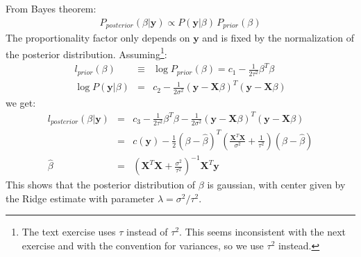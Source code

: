 

From Bayes theorem:
\begin{eqnarray*}
    P_{posterior}(\beta | \mathbf{y}) \propto P(\mathbf{y} | \beta) \, P_{prior}(\beta)
\end{eqnarray*}
The proportionality factor only depends on $\mathbf{y}$ and is fixed by the normalization of
the posterior distribution. Assuming\footnote{The text exercise uses $\tau$ instead of $\tau^2$. This 
    seems inconsistent with the next exercise and with the convention for variances, so we use $\tau^2$ instead.}:
\begin{eqnarray*}
    l_{prior}(\beta) & \equiv & \log{P_{prior}(\beta)} = c_1 - \frac{1}{2 \tau ^2} \beta^T \beta\\
    \log{P(\mathbf{y} | \beta)} & = & c_2 - \frac{1}{2 \sigma^2} \left( \mathbf{y} - \mathbf{X} \beta \right)^T \left( \mathbf{y} - \mathbf{X} \beta \right) 
\end{eqnarray*}
we get:
\begin{eqnarray} \label{3p6_e1}
l_{posterior}(\beta | \mathbf{y}) & = & c_3 - \frac{1}{2 \tau^2} \beta^T \beta - \frac{1}{2 \sigma^2} \left( \mathbf{y} - \mathbf{X} \beta \right)^T \left( \mathbf{y} - \mathbf{X} \beta \right) \\ \nonumber
& = & c(\mathbf{y}) - \frac{1}{2} \left( \beta - \hat{\beta} \right) ^T \left( \frac{\mathbf{X} ^T \mathbf{X} }{ \sigma ^2} + \frac{1}{\tau^2} \right) \left( \beta - \hat{\beta} \right) \\ \nonumber
\hat{\beta} & = & \left( \mathbf{X} ^T \mathbf{X} + \frac{\sigma^2}{ \tau^2} \right)^{-1} \mathbf{X}^T \mathbf{y}
\end{eqnarray}
This shows that the posterior distribution of $\beta$ is gaussian, with center given by the Ridge estimate
with parameter $\lambda = \sigma^2 / \tau^2$.